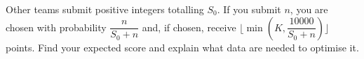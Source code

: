 Other teams submit positive integers totalling $S_0$. If you submit $n$, you are chosen with probability $\dfrac{n}{S_0+n}$ and, if chosen, receive $\lfloor\min(K,\dfrac{10000}{S_0+n})\rfloor$ points. Find your expected score and explain what data are needed to optimise it.
